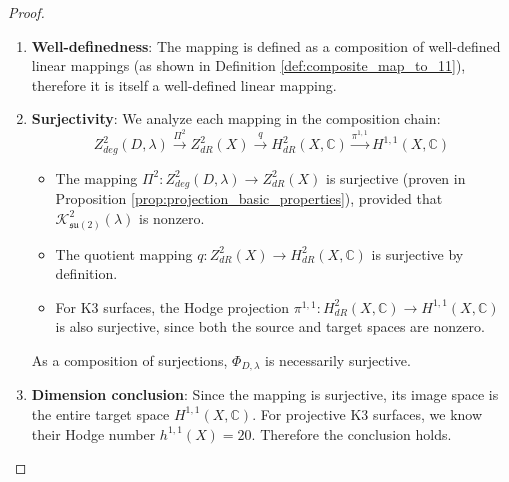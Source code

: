 \documentclass[10pt,a4paper]{amsart}
\begin{document}
\begin{proof}
\begin{enumerate}
    \item \textbf{Well-definedness}: The mapping is defined as a composition of well-defined linear mappings (as shown in Definition \ref{def:composite_map_to_11}), therefore it is itself a well-defined linear mapping.

    \item \textbf{Surjectivity}: We analyze each mapping in the composition chain:
    $$ Z_{deg}^2(D,\lambda) \xrightarrow{\Pi^2} Z^2_{dR}(X) \xrightarrow{q} H^2_{dR}(X, \mathbb{C}) \xrightarrow{\pi^{1,1}} H^{1,1}(X, \mathbb{C}) $$
    \begin{itemize}
        \item The mapping $\Pi^2: Z_{deg}^2(D,\lambda) \to Z^2_{dR}(X)$ is surjective (proven in Proposition \ref{prop:projection_basic_properties}), provided that $\mathcal{K}_{\mathfrak{su}(2)}^2(\lambda)$ is nonzero.
        \item The quotient mapping $q: Z^2_{dR}(X) \to H^2_{dR}(X, \mathbb{C})$ is surjective by definition.
        \item For K3 surfaces, the Hodge projection $\pi^{1,1}: H^2_{dR}(X, \mathbb{C}) \to H^{1,1}(X, \mathbb{C})$ is also surjective, since both the source and target spaces are nonzero.
    \end{itemize}
    As a composition of surjections, $\Phi_{D,\lambda}$ is necessarily surjective.

    \item \textbf{Dimension conclusion}: Since the mapping is surjective, its image space is the entire target space $H^{1,1}(X, \mathbb{C})$. For projective K3 surfaces, we know their Hodge number $h^{1,1}(X)=20$. Therefore the conclusion holds.
\end{enumerate}
\end{proof}
\end{document}
